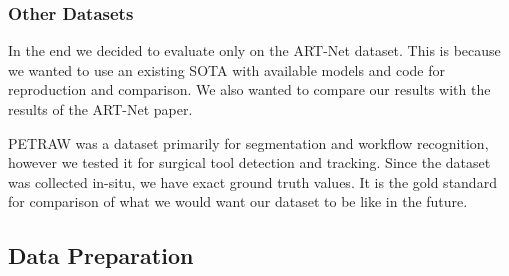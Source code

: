 


\subsubsection{Other Datasets}


In the end we decided to evaluate only on the ART-Net dataset. This is because we wanted to use an existing SOTA with available models and code for reproduction and comparison. We also wanted to compare our results with the results of the ART-Net paper.

PETRAW was a dataset primarily for segmentation and workflow recognition, however we tested it for surgical tool detection and tracking. Since the dataset was collected in-situ, we have exact ground truth values. It is the gold standard for comparison of what we would want our dataset to be like in the future.



\subsection{Data Preparation}








